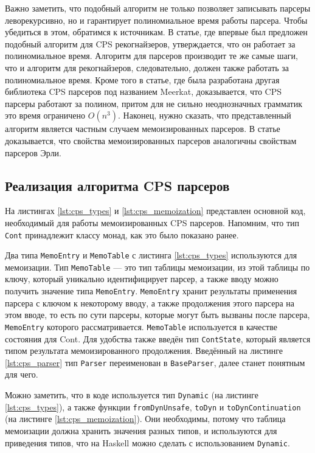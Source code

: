 \documentclass[times]{itmo-student-thesis}
\begin{document}
Важно заметить, что подобный алгоритм не только позволяет записывать парсеры леворекурсивно, но и гарантирует
полиномиальное время работы парсера. Чтобы убедиться в этом, обратимся к источникам. В статье, где впервые был предложен подобный алгоритм для CPS
рекогнайзеров\cite{johnson_memoization_nodate}, утверждается, что он работает  за полиномиальное время. Алгоритм для парсеров
производит те же самые шаги, что и алгоритм для рекогнайзеров, следовательно,  должен также работать за полиномиальное
время. Кроме того в статье, где была разработана другая библиотека CPS парсеров под названием Meerkat\cite{johnson_memoization_nodate},  доказывается,
что CPS парсеры работают за полином, притом для не сильно неоднозначных грамматик это время ограничено
$O(n^3)$. Наконец, нужно сказать, что представленный алгоритм является частным случаем мемоизированных
парсеров. В статье \cite{norvig_techniques_1991} доказывается, что свойства мемоизированных парсеров аналогичны свойствам
парсеров Эрли.

\subsection{Реализация алгоритма CPS парсеров}

На листингах \ref{lst:cps_types} и \ref{lst:cps_memoization} представлен основной код, необходимый для работы мемоизированных CPS парсеров. Напомним,
что тип \lstinline{Cont} принадлежит классу монад, как это было показано ранее.

Два типа \lstinline{MemoEntry} и \lstinline{MemoTable} с листинга \ref{lst:cps_types} используются для мемоизации.
Тип \lstinline{MemoTable} --- это тип таблицы мемоизации, из этой таблицы по ключу, который уникально идентифицирует
парсер, а также вводу можно получить значение типа \lstinline{MemoEntry}. \lstinline{MemoEntry} хранит результаты
применения парсера с ключом к некоторому вводу, а также продолжения этого парсера на этом вводе, то есть по сути
парсеры, которые могут быть вызваны после парсера,
\lstinline{MemoEntry} которого рассматривается. \lstinline{MemoTable} используется в качестве состояния для Cont. Для
удобства также введён тип \lstinline{ContState}, который является типом результата мемоизированного продолжения.
Введённый на листинге \ref{lst:cps_parser} тип \lstinline{Parser} переименован в \lstinline{BaseParser}, далее станет
понятным для чего.

Можно заметить, что в коде используется тип \lstinline{Dynamic} (на листинге \ref{lst:cps_types}), а также функции
\lstinline{fromDynUnsafe}, \lstinline{toDyn} и \lstinline{toDynContinuation} (на листинге \ref{lst:cps_memoization}).
Они необходимы, потому что таблица мемоизации должна хранить значения разных типов, и используются для приведения
типов, что на Haskell можно сделать с использованием \lstinline{Dynamic}\cite{noauthor_datadynamic_nodate}.
\end{document}
